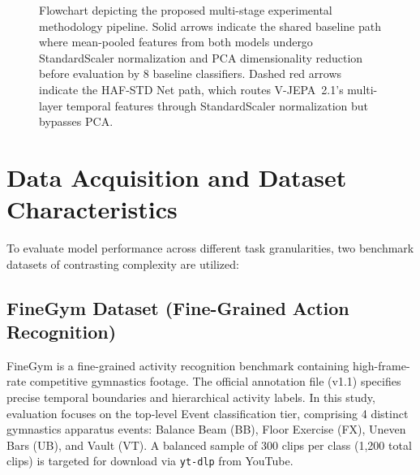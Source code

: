 \begin{figure}[H]

\caption{Flowchart depicting the proposed multi-stage experimental methodology pipeline. Solid arrows indicate the shared baseline path where mean-pooled features from both models undergo StandardScaler normalization and PCA dimensionality reduction before evaluation by 8 baseline classifiers. Dashed red arrows indicate the HAF-STD Net path, which routes V-JEPA~2.1's multi-layer temporal features through StandardScaler normalization but bypasses PCA.}
\label{fig:methodology_pipeline}
\end{figure}


\section{Data Acquisition and Dataset Characteristics}


To evaluate model performance across different task granularities, two benchmark datasets of contrasting complexity are utilized:

\subsection{FineGym Dataset (Fine-Grained Action Recognition)}
FineGym is a fine-grained activity recognition benchmark containing high-frame-rate competitive gymnastics footage. The official annotation file (v1.1) specifies precise temporal boundaries and hierarchical activity labels. In this study, evaluation focuses on the top-level Event classification tier, comprising 4 distinct gymnastics apparatus events: Balance Beam (BB), Floor Exercise (FX), Uneven Bars (UB), and Vault (VT). A balanced sample of 300 clips per class (1,200 total clips) is targeted for download via \texttt{yt-dlp} from YouTube.

